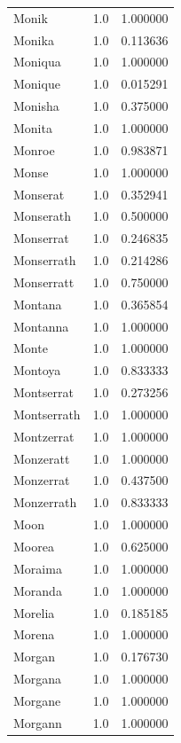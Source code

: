 \documentclass[
  letterpaper,
  DIV=11,
  numbers=noendperiod]{scrreprt}
\begin{document}
\begin{tabular}{lrr}
Monik           &   1.0 &   1.000000 \\
Monika          &   1.0 &   0.113636 \\
Moniqua         &   1.0 &   1.000000 \\
Monique         &   1.0 &   0.015291 \\
Monisha         &   1.0 &   0.375000 \\
Monita          &   1.0 &   1.000000 \\
Monroe          &   1.0 &   0.983871 \\
Monse           &   1.0 &   1.000000 \\
Monserat        &   1.0 &   0.352941 \\
Monserath       &   1.0 &   0.500000 \\
Monserrat       &   1.0 &   0.246835 \\
Monserrath      &   1.0 &   0.214286 \\
Monserratt      &   1.0 &   0.750000 \\
Montana         &   1.0 &   0.365854 \\
Montanna        &   1.0 &   1.000000 \\
Monte           &   1.0 &   1.000000 \\
Montoya         &   1.0 &   0.833333 \\
Montserrat      &   1.0 &   0.273256 \\
Montserrath     &   1.0 &   1.000000 \\
Montzerrat      &   1.0 &   1.000000 \\
Monzeratt       &   1.0 &   1.000000 \\
Monzerrat       &   1.0 &   0.437500 \\
Monzerrath      &   1.0 &   0.833333 \\
Moon            &   1.0 &   1.000000 \\
Moorea          &   1.0 &   0.625000 \\
Moraima         &   1.0 &   1.000000 \\
Moranda         &   1.0 &   1.000000 \\
Morelia         &   1.0 &   0.185185 \\
Morena          &   1.0 &   1.000000 \\
Morgan          &   1.0 &   0.176730 \\
Morgana         &   1.0 &   1.000000 \\
Morgane         &   1.0 &   1.000000 \\
Morgann         &   1.0 &   1.000000 \\

\end{tabular}
\end{document}

